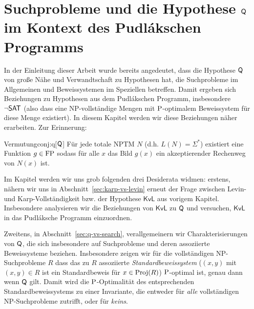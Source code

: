 \chapter{Suchprobleme und die Hypothese $\hQ$ im Kontext des Pudlákschen Programms}\label{chap:pudlak}


In der Einleitung dieser Arbeit wurde bereits angedeutet, dass die Hypothese $\hQ$ von \citeauthor{fenner_inverting_2003} große Nähe und Verwandtschaft zu Hypothesen hat, die Suchprobleme im Allgemeinen und Beweissystemen im Speziellen betreffen. Damit ergeben sich Beziehungen zu Hypothesen aus dem Pudlákschen Programm, insbesondere $\neg\hSAT$ (also dass eine NP-vollständige Mengen mit $\P$-optimalem Beweissystem für diese Menge existiert).
In diesem Kapitel werden wir diese Beziehungen näher erarbeiten. Zur Erinnerung:

\begin{reptheorem}{Vermutung}{conj:q}[$\hQ$]
    Für jede totale NPTM $N$ (d.h. $L(N)=\Sigma^*$) existiert eine Funktion $g\in\FP$ sodass für alle $x$ das Bild $g(x)$ ein akzeptierender Rechenweg von $N(x)$ ist. 
\end{reptheorem}


Im Kapitel werden wir uns grob folgenden drei Desiderata widmen: 
erstens, nähern wir uns in Abschnitt~\ref{sec:karp-vs-levin} erneut der Frage zwischen Levin- und Karp-Vollständigkeit bzw. der Hypothese $\mathsf{KvL}$ aus vorigem Kapitel. Insbesondere analysieren wir die Beziehungen von $\mathsf{KvL}$ zu $\hQ$ und versuchen, $\mathsf{KvL}$ in das Pudláksche Programm einzuordnen.

Zweitens, in Abschnitt~\ref{sec:q-vs-search}, verallgemeinern wir Charakterisierungen von $\hQ$, die sich insbesondere auf Suchprobleme und deren assoziierte Beweissysteme beziehen.
Insbesondere zeigen wir für die vollständigen NP-Suchprobleme $R$ dass das zu $R$ assoziierte \emph{Standardbeweissystem} ($(x,y)$ mit $(x,y)\in R$ ist ein Standardbeweis für $x\in\Proj(R)$) $\P$-optimal ist, genau dann wenn $\hQ$ gilt. Damit wird die $\P$-Optimalität des entsprechenden Standardbeweissystems zu einer Invariante, die entweder für \emph{alle} vollständigen NP-Suchprobleme zutrifft, oder für \emph{keins}.


